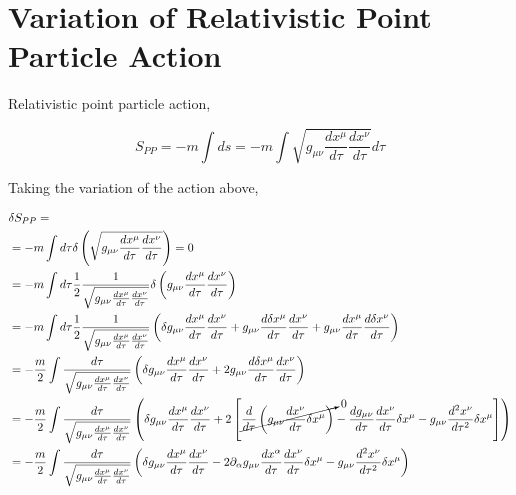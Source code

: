 \section{Variation of Relativistic Point Particle Action \label{sec:variation_of_rpp_action}}

Relativistic point particle action,

\begin{equation}
S_{PP} = -m\int ds = -m\int \sqrt{g_{\mu\nu}\frac{dx^{\mu}}{d\tau}\frac{dx^{\nu}}{d\tau}}d\tau
\end{equation}

Taking the variation of the action above,

\begin{equation}
\begin{split}
&\delta S_{PP} =\\
&= -m\int d\tau \delta\left(\sqrt{g_{\mu\nu}\frac{dx^{\mu}}{d\tau}\frac{dx^{\nu}}{d\tau}}\right) = 0\\
&= -m\int d\tau \frac{1}{2}\frac{1}{\sqrt{g_{\mu\nu}\frac{dx^{\mu}}{d\tau}\frac{dx^{\nu}}{d\tau}}}\delta\left(g_{\mu\nu}\frac{dx^{\mu}}{d\tau}\frac{dx^{\nu}}{d\tau}\right)\\
&= -m\int d\tau \frac{1}{2}\frac{1}{\sqrt{g_{\mu\nu}\frac{dx^{\mu}}{d\tau}\frac{dx^{\nu}}{d\tau}}}\left(\delta g_{\mu\nu}\frac{dx^{\mu}}{d\tau}\frac{dx^{\nu}}{d\tau} + g_{\mu\nu}\frac{d\delta x^{\mu}}{d\tau}\frac{dx^{\nu}}{d\tau} + g_{\mu\nu}\frac{dx^{\mu}}{d\tau}\frac{d\delta x^{\nu}}{d\tau}\right)\\
&= -\frac{m}{2}\int \frac{d\tau}{\sqrt{g_{\mu\nu}\frac{dx^{\mu}}{d\tau}\frac{dx^{\nu}}{d\tau}}}\left(\delta g_{\mu\nu}\frac{dx^{\mu}}{d\tau}\frac{dx^{\nu}}{d\tau} + 2g_{\mu\nu}\frac{d\delta x^{\mu}}{d\tau}\frac{dx^{\nu}}{d\tau}\right)\\
&= -\frac{m}{2}\int \frac{d\tau}{\sqrt{g_{\mu\nu}\frac{dx^{\mu}}{d\tau}\frac{dx^{\nu}}{d\tau}}}\left(\delta g_{\mu\nu}\frac{dx^{\mu}}{d\tau}\frac{dx^{\nu}}{d\tau} + 2\left[\cancelto{0}{\frac{d}{d\tau}\left(g_{\mu\nu}\frac{dx^{\nu}}{d\tau}\delta x^{\mu}\right)} - \frac{dg_{\mu\nu}}{d\tau}\frac{dx^{\nu}}{d\tau}\delta x^{\mu} - g_{\mu\nu}\frac{d^{2}x^{\nu}}{d\tau^{2}}\delta x^{\mu}\right]\right)\\
&= -\frac{m}{2}\int \frac{d\tau}{\sqrt{g_{\mu\nu}\frac{dx^{\mu}}{d\tau}\frac{dx^{\nu}}{d\tau}}}\left(\delta g_{\mu\nu}\frac{dx^{\mu}}{d\tau}\frac{dx^{\nu}}{d\tau} - 2 \partial_{\alpha}g_{\mu\nu}\frac{dx^{\alpha}}{d\tau}\frac{dx^{\nu}}{d\tau}\delta x^{\mu} - g_{\mu\nu}\frac{d^{2}x^{\nu}}{d\tau^{2}}\delta x^{\mu}\right)\\

\end{split}
\end{equation}
